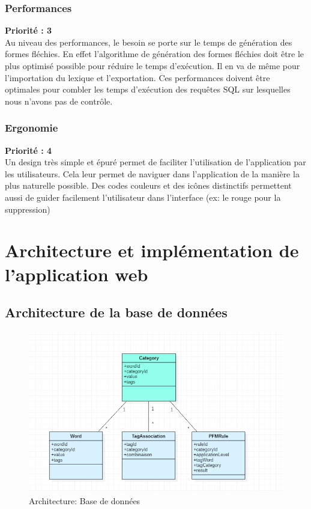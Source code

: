\documentclass[12pt,a4paper]{article}
\begin{document}
    \subsubsection{Performances}
    \textbf{Priorité : 3} \\
    Au niveau des performances, le besoin se porte sur le temps de génération des formes fléchies. En effet l'algorithme de génération des formes fléchies doit être le plus optimisé possible pour réduire le temps d'exécution.
    Il en va de même pour l'importation du lexique et l'exportation.
    Ces performances doivent être optimales pour combler les temps d'exécution des requêtes SQL sur lesquelles nous n'avons pas de contrôle.

    \subsubsection{Ergonomie}
    \textbf{Priorité : 4} \\
    Un design très simple et épuré permet de faciliter l'utilisation de l'application par les utilisateurs. Cela leur permet de naviguer dans l'application de la manière la plus naturelle possible.
    \smallbreak
    Des codes couleurs et des icônes distinctifs permettent aussi de guider facilement l'utilisateur dans l'interface (ex: le rouge pour la suppression)

    \newpage
    \section{Architecture et implémentation de l'application web}

    \subsection{Architecture de la base de données }

    \begin{figure}[h]
        \centering
        \includegraphics[width=150mm]{img/Capture.PNG}
        \caption{Architecture: Base de données}
        \label{Tux}
    \end{figure}
\end{document}
